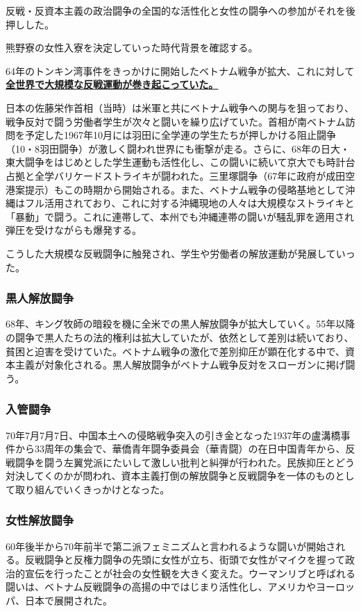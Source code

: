 \vspace{1mm}
\noindent 反戦・反資本主義の政治闘争の全国的な活性化と女性の闘争への参加がそれを後押しした。


\vspace{10mm}
\newline 熊野寮の女性入寮を決定していった時代背景を確認する。
\par 64年のトンキン湾事件をきっかけに開始したベトナム戦争が拡大、これに対して\uline{\bf{全世界で大規模な反戦運動が巻き起こっていた。}}
\par 日本の佐藤栄作首相（当時）は米軍と共にベトナム戦争への関与を狙っており、戦争反対で闘う労働者学生が次々と闘いを繰り広げていた。首相が南ベトナム訪問を予定した1967年10月には羽田に全学連の学生たちが押しかける阻止闘争（10・8羽田闘争）が激しく闘われ世界にも衝撃が走る。さらに、68年の日大・東大闘争をはじめとした学生運動も活性化し、この闘いに続いて京大でも時計台占拠と全学バリケードストライキが闘われた。三里塚闘争（67年に政府が成田空港案提示）もこの時期から開始される。また、ベトナム戦争の侵略基地として沖縄はフル活用されており、これに対する沖縄現地の人々は大規模なストライキと「暴動」で闘う。これに連帯して、本州でも沖縄連帯の闘いが騒乱罪を適用され弾圧を受けながらも爆発する。\par こうした大規模な反戦闘争に触発され、学生や労働者の解放運動が発展していった。

\subsubsection{\large 黒人解放闘争}
68年、キング牧師の暗殺を機に全米での黒人解放闘争が拡大していく。55年以降の闘争で黒人たちの法的権利は拡大していたが、依然として差別は続いており、貧困と迫害を受けていた。ベトナム戦争の激化で差別抑圧が顕在化する中で、資本主義が対象化される。黒人解放闘争がベトナム戦争反対をスローガンに掲げ闘う。

\subsubsection{\large 入管闘争}
70年7月7月7日、中国本土への侵略戦争突入の引き金となった1937年の盧溝橋事件から33周年の集会で、華僑青年闘争委員会（華青闘）の在日中国青年から、反戦闘争を闘う左翼党派にたいして激しい批判と糾弾が行われた。民族抑圧とどう対決してくのかが問われ、資本主義打倒の解放闘争と反戦闘争を一体のものとして取り組んでいくきっかけとなった。

\subsubsection{\large 女性解放闘争}
60年後半から70年前半で第二派フェミニズムと言われるような闘いが開始される。反戦闘争と反権力闘争の先頭に女性が立ち、街頭で女性がマイクを握って政治的宣伝を行ったことが社会の女性観を大きく変えた。ウーマンリブと呼ばれる闘いは、ベトナム反戦闘争の高揚の中ではじまり活性化し、アメリカやヨーロッパ、日本で展開された。

